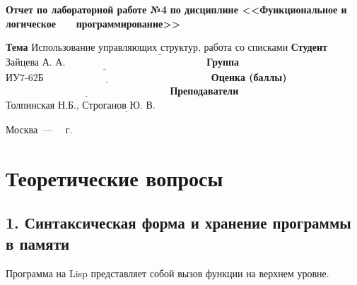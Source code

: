 \documentclass[12pt]{report}
\begin{document}
\begin{titlepage}
		\begin{center}
			\noindent\begin{minipage}{1.1\textwidth}\centering
				\Large\textbf{  Отчет по лабораторной работе №4}\newline
				\textbf{по дисциплине <<Функциональное и логическое}\newline
				\textbf{~~~программирование>>}\newline\newline
			\end{minipage}
		\end{center}
		
		\noindent\textbf{Тема} $\underline{\text{Использование управляющих структур, работа со списками}}$\newline\newline
		\noindent\textbf{Студент} $\underline{\text{Зайцева А. А.~~~~~~~~~~~~~~~~~~~~~~~~~~~~~~~~~~~~~~~~~~}}$\newline\newline
		\noindent\textbf{Группа} $\underline{\text{ИУ7-62Б~~~~~~~~~~~~~~~~~~~~~~~~~~~~~~~~~~~~~~~~~~~~~~~~~~}}$\newline\newline
		\noindent\textbf{Оценка (баллы)} $\underline{\text{~~~~~~~~~~~~~~~~~~~~~~~~~~~~~~~~~~~~~~~~~~~~~~~~~}}$\newline\newline
		\noindent\textbf{Преподаватели} $\underline{\text{Толпинская Н.Б., Строганов Ю. В.~~~~~~~~~~~~~~~~~~~~~~~~~~~~}}$\newline\newline\newline
		
		\begin{center}
			\vfill
			Москва~---~\the\year
			~г.
		\end{center}
	\end{titlepage}
	
\chapter*{Теоретические вопросы}

\section*{1. Синтаксическая форма и хранение программы в памяти}

Программа на Lisp представляет собой вызов функции на верхнем уровне. 
\end{document}
